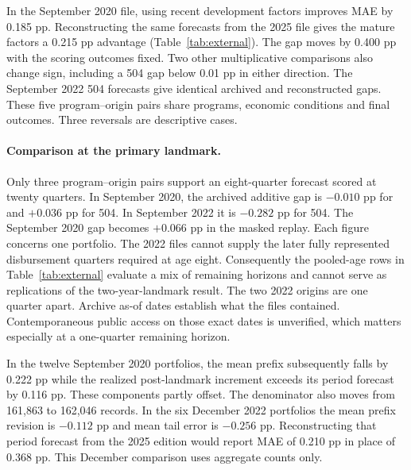 In the September 2020 \sba{} file, using recent development factors improves MAE by 0.185 pp. Reconstructing the same forecasts from the 2025 file gives the mature factors a 0.215 pp advantage (Table~\ref{tab:external}). The gap moves by 0.400 pp with the scoring outcomes fixed. Two other multiplicative comparisons also change sign, including a 504 gap below 0.01 pp in either direction. The September 2022 504 forecasts give identical archived and reconstructed gaps. These five program--origin pairs share programs, economic conditions and final outcomes. Three reversals are descriptive cases.



\paragraph{Comparison at the primary landmark.}
Only three program--origin pairs support an eight-quarter forecast scored at twenty quarters. In September 2020, the archived additive gap is $-0.010$ pp for \sba{} and $+0.036$ pp for 504. In September 2022 it is $-0.282$ pp for 504. The September 2020 \sba{} gap becomes $+0.066$ pp in the masked replay. Each figure concerns one portfolio. The 2022 \sba{} files cannot supply the later fully represented disbursement quarters required at age eight. Consequently the pooled-age rows in Table~\ref{tab:external} evaluate a mix of remaining horizons and cannot serve as replications of the two-year-landmark result. The two 2022 origins are one quarter apart. Archive as-of dates establish what the files contained. Contemporaneous public access on those exact dates is unverified, which matters especially at a one-quarter remaining horizon.

In the twelve September 2020 \sba{} portfolios, the mean prefix subsequently falls by 0.222 pp while the realized post-landmark increment exceeds its period forecast by 0.116 pp. These components partly offset. The denominator also moves from 161,863 to 162,046 records. In the six December 2022 \sba{} portfolios the mean prefix revision is $-0.112$ pp and mean tail error is $-0.256$ pp. Reconstructing that period forecast from the 2025 edition would report MAE of 0.210 pp in place of 0.368 pp. This December comparison uses aggregate counts only.
